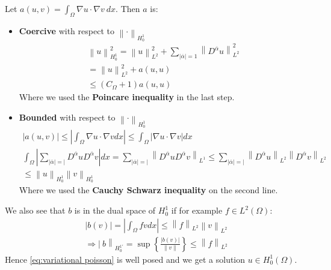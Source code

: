\documentclass[../Main/main.tex]{subfiles}
\begin{document}
	\begin{example}
		Let $a(u,v) = \int_{\Omega}\nabla u \cdot \nabla v \ dx$. Then $a$ is:
		\begin{itemize}
			\item \textbf{Coercive} with respect to $\left \| \cdot \right \|_{H_0^1}$
			\begin{equation*}
				\begin{gathered}
					\left \| u \right \|^2_{H_0^1} = \left \| u \right \|^2_{L^2} + \sum_{|\overline{\alpha}|=1} \left \| D^{\overline{\alpha}} u \right \|^2_{L^2}\\
					=\left \|u\right \|^2_{L^2} + a(u,u) \\
					\leq (C_{\Omega} + 1)a(u,u)
				\end{gathered}
			\end{equation*}
			Where we used the \textbf{Poincare inequality} in the last step.
			\item \textbf{Bounded} with respect to $\left \| \cdot \right \|_{H_0^1}$
			\begin{equation*}
				\begin{gathered}
					|a(u,v)|\leq |\int_{\Omega}\nabla u \cdot \nabla v dx| \leq \int_{\Omega} |\nabla u \cdot \nabla v| dx \\
					\int_{\Omega} |\sum_{|\overline{\alpha}|=|}D^{\overline{\alpha}}u D^{\overline{\alpha}}v|dx=\sum_{|\overline{\alpha}|=|} \left \| D^{\overline{\alpha}}u D^{\overline{\alpha}}v \right \|_{L^1} \leq \sum_{|\overline{\alpha}|=|} \left \| D^{\overline{\alpha}}u \right \|_{L^2} \left \| D^{\overline{\alpha}}v \right \|_{L^2} \\
					\leq \left \|u \right \|_{H_0^1} \left \| v \right \|_{H_0^1}
				\end{gathered}
			\end{equation*}
			Where we used the \textbf{Cauchy Schwarz inequality} on the second line.
		\end{itemize}
		We also see that $b$ is in the dual space of $H_0^1$ if for example $f\in L^2(\Omega)$:
		\begin{equation*}
			\begin{gathered}
			|b(v)| = |\int_{\Omega} fv dx | \leq \left \|f \right \|_{L^2} \left \| v \right \|_{L^2} \\
			\Rightarrow \left |\ b \right \|_{H_0^{1'}} = \sup\left \{ \frac{|b(v)|}{\left \| v \right \|} \right \} \leq \left \| f \right \|_{L^2}
			\end{gathered}
		\end{equation*}
		Hence \eqref{eq:variational poisson} is well posed and we get a solution $u \in H_0^1(\Omega)$.
	\end{example}
\end{document}
